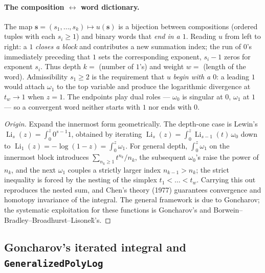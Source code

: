 \documentclass[11pt]{article}
\DeclareMathOperator{\Li}{Li}
\theoremstyle{plain}
\theoremstyle{remark}
\begin{document}
\paragraph{The composition $\leftrightarrow$ word dictionary.} The map $\mathbf s=(s_1,\dots,s_k)\mapsto u(\mathbf s)$ is a bijection between compositions (ordered tuples with each $s_i\ge1$) and binary words that \emph{end in a $1$}. Reading $u$ from left to right: a $1$ \emph{closes a block} and contributes a new summation index; the run of $0$'s immediately preceding that $1$ sets the corresponding exponent, $s_i-1$ zeros for exponent $s_i$. Thus depth $k=$ (number of $1$'s) and weight $w=$ (length of the word). Admissibility $s_1\ge2$ is the requirement that $u$ \emph{begin with a $0$}: a leading $1$ would attach $\omega_1$ to the top variable and produce the logarithmic divergence at $t_w\to1$ when $z=1$. The endpoints play dual roles --- $\omega_0$ is singular at $0$, $\omega_1$ at $1$ --- so a convergent word neither starts with $1$ nor ends with $0$.

\begin{proof}[Origin]
Expand the innermost form geometrically. The depth-one case is Lewin's
$\Li_s(z)=\int_0^z 0^{s-1}1$, obtained by iterating $\Li_s(z)=\int_0^z\Li_{s-1}(t)\,\omega_0$ down to $\Li_1(z)=-\log(1-z)=\int_0^z\omega_1$. For general depth, $\int_0^z\omega_1$ on the innermost block introduces $\sum_{n_k\ge1}t^{n_k}/n_k$, the subsequent $\omega_0$'s raise the power of $n_k$, and the next $\omega_1$ couples a strictly larger index $n_{k-1}>n_k$; the strict inequality is forced by the nesting of the simplex $t_1<\dots<t_w$. Carrying this out reproduces the nested sum, and Chen's theory (1977) guarantees convergence and homotopy invariance of the integral. The general framework is due to Goncharov; the systematic exploitation for these functions is Goncharov's and Borwein--Bradley--Broadhurst--Lisone\v{k}'s.
\end{proof}

\subsection{Goncharov's iterated integral and \texttt{GeneralizedPolyLog}}
\end{document}

